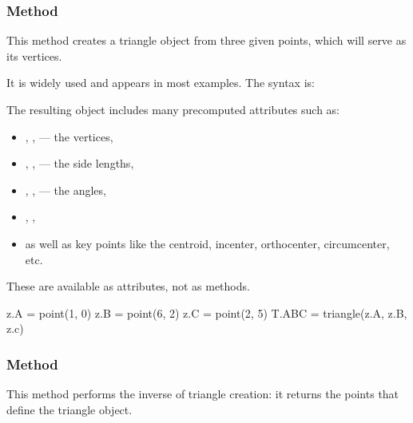   \egroup



\subsubsection{Method } %
\label{ssub:method_triangle_new_pt_pt_pt}

This method creates a triangle object from three given points, which will serve as its vertices.

\medskip
\noindent
It is widely used and appears in most examples. The syntax is:

\begin{center}
\end{center}

\noindent
The resulting object includes many precomputed attributes such as:
\begin{itemize}
  \item {}, ,  — the vertices,
  \item {}, ,  — the side lengths,
  \item {}, ,  — the angles,
  \item {}, ,
  \item as well as key points like the centroid, incenter, orthocenter, circumcenter, etc.
\end{itemize}

\noindent
These are available as attributes, not as methods.

\vspace{1em}
\begin{mybox}
  \begin{tkzexample}
    z.A = point(1, 0)
    z.B = point(6, 2)
    z.C = point(2, 5)
    T.ABC = triangle(z.A, z.B, z.c)
  \end{tkzexample}
\end{mybox}

\subsubsection{Method } %
\label{ssub:method_triangle_get}

This method performs the inverse of triangle creation: it returns the points that define the triangle object.

